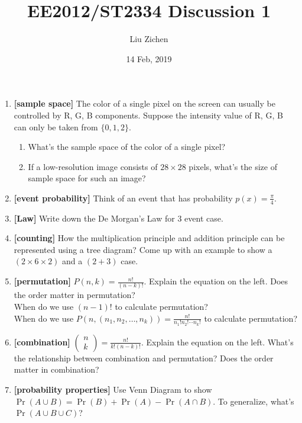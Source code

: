 \documentclass[a4paper]{article}
\title{EE2012/ST2334 Discussion 1}
\author{Liu Zichen}
\date{14 Feb, 2019}
\begin{document}
\maketitle

\begin{enumerate}
\item
\textbf{[sample space]}
The color of a single pixel on the screen can usually be controlled by R, G, B components. Suppose the intensity value of R, G, B can only be taken from $ \{0, 1, 2\}$.
\begin{enumerate}
    \item What's the sample space of the color of a single pixel?
    \item If a low-resolution image consists of $28 \times 28$ pixels, what's the size of sample space for such an image?
\end{enumerate}

\item
\textbf{[event probability]}
Think of an event that has probability $p(x)=\frac{\pi}{4}$.

\item
\textbf{[Law]}
Write down the De Morgan’s Law for 3 event case.

\item
\textbf{[counting]}
How the multiplication principle and addition principle can be represented using a tree diagram? Come up with an example to show a $(2 \times 6 \times 2)$ and a $(2 + 3)$ case.

\item
\textbf{[permutation]}
$P(n, k) = \frac { n ! } { ( n - k ) ! }$. Explain the equation on the left. Does the order matter in permutation?\\
When do we use $(n - 1)!$ to calculate permutation?\\
When do we use $P(n, (n_1, n_2, \ldots, n_k)) = \frac { n ! } { n _ { 1 } ! n _ { 2 } ! \cdots n _ { k } ! }$ to calculate permutation?

\item
\textbf{[combination]}
$\left( \begin{array} { l } { n } \\ { k } \end{array} \right) = \frac { n ! } { k ! ( n - k ) ! }$. Explain the equation on the left. What's the relationship between combination and permutation? Does the order matter in combination?

\item
\textbf{[probability properties]}
Use Venn Diagram to show $\operatorname { Pr } ( A \cup B ) = \operatorname { Pr } ( B ) + \operatorname { Pr } ( A ) - \operatorname { Pr } ( A \cap B )$. To generalize, what's $\operatorname { Pr } ( A \cup B \cup C)$?


\end{enumerate}
\end{document}
